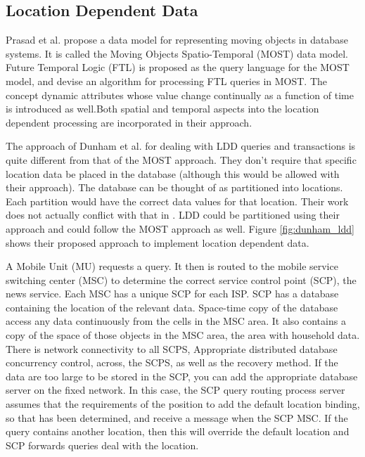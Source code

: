 \documentclass[12pt,a4paper,titlepage]{article}
\begin{document}
\subsection{Location Dependent Data} %
\label{sub:location_dependent_data_c}
Prasad et al. propose a data model for representing moving objects in database systems. It is called the Moving Objects Spatio-Temporal (MOST) data model. Future Temporal Logic (FTL) is proposed as the query language for the MOST model, and devise an algorithm for processing FTL queries in MOST. \cite{prasad1997modeling} The concept dynamic attributes whose value change continually as a function of time is introduced as well.Both spatial and temporal aspects into the location dependent processing are incorporated in their approach.

The approach of Dunham et al. for dealing with LDD queries and transactions is quite different from that of the MOST approach. They don't require that specific location data be  placed in the database (although this would be allowed with their approach). The database can be thought of as partitioned into locations. Each partition would have the correct data values for that location. Their work does not actually conflict with that in \cite{prasad1997modeling}. LDD could be partitioned using their approach and could follow the MOST approach as well. \cite{Dunham:1998ci} Figure \ref{fig:dunham_ldd} shows their proposed approach to implement location dependent data. 

A Mobile Unit (MU) requests a query. It then is routed to the mobile service switching center (MSC) to determine the correct service control point (SCP), the news service. Each MSC has a unique SCP for each ISP. SCP has a database containing the location of the relevant data. Space-time copy of the database access any data continuously from the cells in the MSC area. It also contains a copy of the space of those objects in the MSC area, the area with household data. There is network connectivity to all SCPS, Appropriate distributed database concurrency control, across, the SCPS, as well as the recovery method. If the data are too large to be stored in the SCP, you can add the appropriate database server on the fixed network. In this case, the SCP query routing process server assumes that the requirements of the position to add the default location binding, so that has been determined, and receive a message when the SCP MSC. If the query contains another location, then this will override the default location and SCP forwards queries deal with the location. \cite{Dunham:1998ci}
\end{document}
